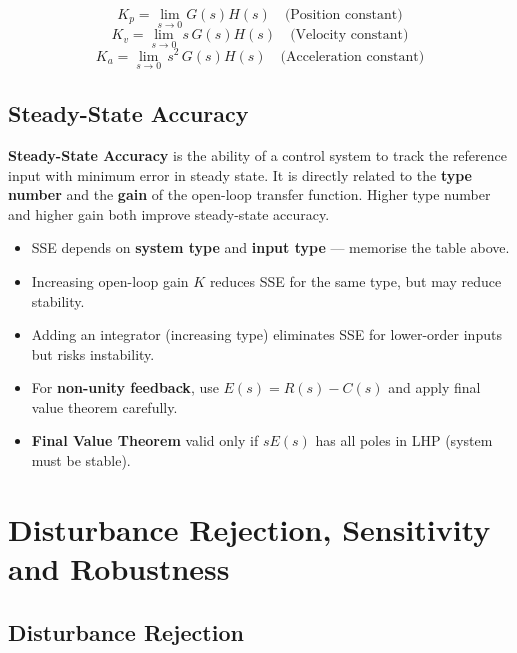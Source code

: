 \documentclass[12pt,a4paper]{article}
\begin{document}
\begin{tcolorbox}[formulabox, title={Error Constants}]
$$K_p = \lim_{s\to 0} G(s)H(s) \quad \text{(Position constant)}$$
$$K_v = \lim_{s\to 0}\, s\,G(s)H(s) \quad \text{(Velocity constant)}$$
$$K_a = \lim_{s\to 0}\, s^2\,G(s)H(s) \quad \text{(Acceleration constant)}$$
\end{tcolorbox}

\subsection{Steady-State Accuracy}

\begin{tcolorbox}[defbox]
\textbf{Steady-State Accuracy} is the ability of a control system to track the reference input with minimum error in steady state. It is directly related to the \textbf{type number} and the \textbf{gain} of the open-loop transfer function. Higher type number and higher gain both improve steady-state accuracy.
\end{tcolorbox}

\begin{tcolorbox}[exambox, title={Exam Tips — SSE}]
\begin{itemize}[leftmargin=*, itemsep=3pt, topsep=0pt]
  \item SSE depends on \textbf{system type} and \textbf{input type} — memorise the table above.
  \item Increasing open-loop gain $K$ reduces SSE for the same type, but may reduce stability.
  \item Adding an integrator (increasing type) eliminates SSE for lower-order inputs but risks instability.
  \item For \textbf{non-unity feedback}, use $E(s) = R(s) - C(s)$ and apply final value theorem carefully.
  \item \textbf{Final Value Theorem} valid only if $sE(s)$ has all poles in LHP (system must be stable).
\end{itemize}
\end{tcolorbox}

\section{Disturbance Rejection, Sensitivity and Robustness}

\subsection{Disturbance Rejection}
\end{document}
